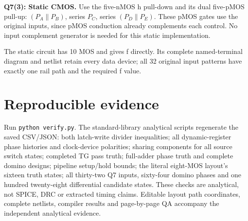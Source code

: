\documentclass[10pt]{article}
\newcommand{\mos}[4]{\begin{scope}[shift={(#1,#2)}]
\draw(0,.24)--(0,-.24);\draw(0,.2)--(.25,.2)--(.25,.5);\draw(0,-.2)--(.25,-.2)--(.25,-.5);
\draw(-.16,.23)--(-.16,-.23);
\ifnum#4=1\draw(-.26,0)circle(.06);\draw(-.75,0)--(-.32,0);\else\draw(-.75,0)--(-.16,0);\fi
\node[anchor=east,font=\scriptsize]at(-.76,0){$#3$};\end{scope}}
\begin{document}
\textbf{Q7(3): Static CMOS.} Use the five-nMOS h pull-down and its dual five-pMOS pull-up: $(P_A\parallel P_B)$, series $P_C$, series $(P_D\parallel P_E)$. These pMOS gates use the original inputs, since pMOS conduction already complements each control. No input complement generator is needed for this static implementation.
\begin{center}\end{center}
The static circuit has 10 MOS and gives f directly. Its complete named-terminal diagram and netlist retain every data device; all 32 original input patterns have exactly one rail path and the required f value.

\section*{Reproducible evidence}
Run \texttt{python verify.py}. The standard-library analytical scripts regenerate the saved CSV/JSON: both latch-write divider inequalities; all dynamic-register phase histories and clock-device polarities; sharing components for all source switch states; completed TG pass truth; full-adder phase truth and complete domino designs; pipeline setup/hold bounds; the literal eight-MOS layout's sixteen truth states; all thirty-two Q7 inputs, sixty-four domino phases and one hundred twenty-eight differential candidate states. These checks are analytical, not SPICE, DRC or extracted timing claims. Editable layout path coordinates, complete netlists, compiler results and page-by-page QA accompany the independent analytical evidence.
\end{document}

